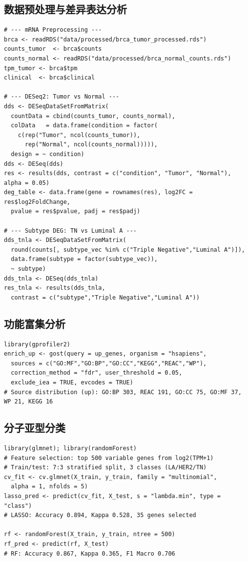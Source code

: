 \documentclass[12pt,a4paper]{ctexart}
\begin{document}
\subsection{数据预处理与差异表达分析}
\begin{lstlisting}[caption={01\_data\_preprocessing.R + 04\_diff\_expression.R}, basicstyle=\ttfamily\scriptsize]
# --- mRNA Preprocessing ---
brca <- readRDS("data/processed/brca_tumor_processed.rds")
counts_tumor  <- brca$counts
counts_normal <- readRDS("data/processed/brca_normal_counts.rds")
tpm_tumor <- brca$tpm
clinical  <- brca$clinical

# --- DESeq2: Tumor vs Normal ---
dds <- DESeqDataSetFromMatrix(
  countData = cbind(counts_tumor, counts_normal),
  colData   = data.frame(condition = factor(
    c(rep("Tumor", ncol(counts_tumor)),
      rep("Normal", ncol(counts_normal))))),
  design = ~ condition)
dds <- DESeq(dds)
res <- results(dds, contrast = c("condition", "Tumor", "Normal"), alpha = 0.05)
deg_table <- data.frame(gene = rownames(res), log2FC = res$log2FoldChange,
  pvalue = res$pvalue, padj = res$padj)

# --- Subtype DEG: TN vs Luminal A ---
dds_tnla <- DESeqDataSetFromMatrix(
  round(counts[, subtype_vec %in% c("Triple Negative","Luminal A")]),
  data.frame(subtype = factor(subtype_vec)),
  ~ subtype)
dds_tnla <- DESeq(dds_tnla)
res_tnla <- results(dds_tnla,
  contrast = c("subtype","Triple Negative","Luminal A"))
\end{lstlisting}

\subsection{功能富集分析}
\begin{lstlisting}[caption={g:Profiler enrichment}, basicstyle=\ttfamily\scriptsize]
library(gprofiler2)
enrich_up <- gost(query = up_genes, organism = "hsapiens",
  sources = c("GO:MF","GO:BP","GO:CC","KEGG","REAC","WP"),
  correction_method = "fdr", user_threshold = 0.05,
  exclude_iea = TRUE, evcodes = TRUE)
# Source distribution (up): GO:BP 303, REAC 191, GO:CC 75, GO:MF 37, WP 21, KEGG 16
\end{lstlisting}

\subsection{分子亚型分类}
\begin{lstlisting}[caption={05\_classification.R}, basicstyle=\ttfamily\scriptsize]
library(glmnet); library(randomForest)
# Feature selection: top 500 variable genes from log2(TPM+1)
# Train/test: 7:3 stratified split, 3 classes (LA/HER2/TN)
cv_fit <- cv.glmnet(X_train, y_train, family = "multinomial",
  alpha = 1, nfolds = 5)
lasso_pred <- predict(cv_fit, X_test, s = "lambda.min", type = "class")
# LASSO: Accuracy 0.894, Kappa 0.528, 35 genes selected

rf <- randomForest(X_train, y_train, ntree = 500)
rf_pred <- predict(rf, X_test)
# RF: Accuracy 0.867, Kappa 0.365, F1 Macro 0.706
\end{lstlisting}
\end{document}
